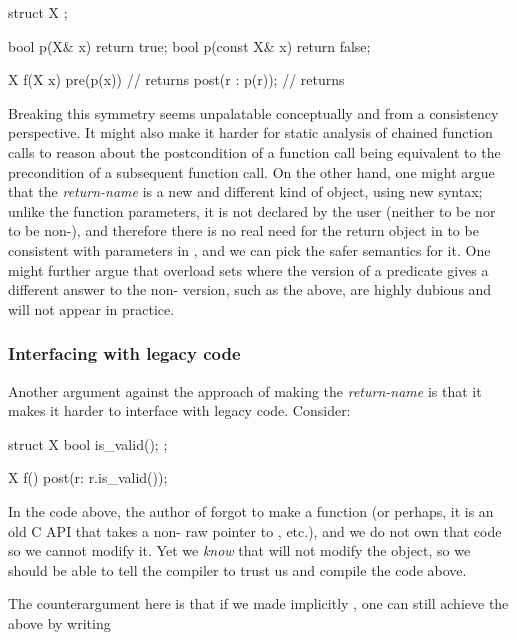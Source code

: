 \begin{codeblock}
struct X {};

bool p(X& x)       { return true; }
bool p(const X& x) { return false; } 

X f(X x)
  pre(p(x))        // returns 
  post(r : p(r));  // returns 
\end{codeblock}

Breaking this symmetry seems unpalatable conceptually and from a consistency perspective. It might also make it harder for static analysis of chained function calls to reason about the postcondition of a function call being equivalent to the precondition of a subsequent function call. On the other hand, one might argue that the \emph{return-name} is a new and different kind of object, using new syntax; unlike the function parameters, it is not declared by the user (neither to be  nor to be non-), and therefore there is no real need for the return object in  to be consistent with parameters in , and we can pick the safer semantics for it. One might further argue that overload sets where the  version of a predicate gives a different answer to the non- version, such as the above, are highly dubious and will not appear in practice.

\subsubsection{Interfacing with legacy code}

Another argument against the approach of making the \emph{return-name}  is that it makes it harder to interface with legacy code. Consider:

\begin{codeblock}
struct X {
  bool is_valid();
};

X f()
  post(r: r.is_valid());
\end{codeblock}

In the code above, the author of  forgot to make  a  function (or perhaps, it is an old C API that takes a non- raw pointer to , etc.), and we do not own that code so we cannot modify it. Yet we \emph{know} that  will not modify the object, so we should be able to tell the compiler to trust us and compile the code above.

The counterargument here is that if we made  implicitly , one can still achieve the above by writing

